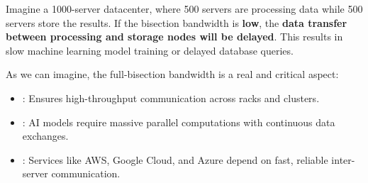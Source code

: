 \begin{examplebox}
    Imagine a 1000-server datacenter, where 500 servers are processing data while 500 servers store the results. If the bisection bandwidth is \textbf{low}, the \textbf{data transfer between processing and storage nodes will be delayed}. This results in slow machine learning model training or delayed database queries.
\end{examplebox}

\noindent
As we can imagine, the full-bisection bandwidth is a real and critical aspect:
\begin{itemize}
    \item {}: Ensures high-throughput communication across racks and clusters.
    \item {}: AI models require massive parallel computations with continuous data exchanges.
    \item {}: Services like AWS, Google Cloud, and Azure depend on fast, reliable inter-server communication.
\end{itemize}

